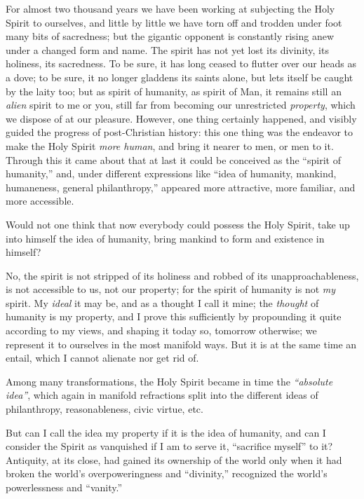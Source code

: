 For almost two thousand years we have been working at subjecting the Holy 
Spirit to ourselves, and little by little we have torn off and trodden under 
foot many bits of sacredness; but the gigantic opponent is constantly rising 
anew under a changed form and name. The spirit has not yet lost its divinity, 
its holiness, its sacredness. To be sure, it has long ceased to flutter over 
our heads as a dove; to be sure, it no longer gladdens its saints alone, but 
lets itself be caught by the laity too; but as spirit of humanity, as spirit 
of Man, it remains still an \textit{alien} spirit to me or you, still far from 
becoming our unrestricted \textit{property}, which we dispose of at our 
pleasure. However, one thing certainly happened, and visibly guided the 
progress of post-Christian history: this one thing was the endeavor to make 
the Holy Spirit \textit{more human}, and bring it nearer to men, or men to it. 
Through this it came about that at last it could be conceived as the ``spirit 
of humanity,'' and, under different expressions like ``idea of humanity, 
mankind, humaneness, general philanthropy,'' appeared more attractive, more 
familiar, and more accessible.

Would not one think that now everybody could possess the Holy Spirit, take up 
into himself the idea of humanity, bring mankind to form and existence in 
himself?

No, the spirit is not stripped of its holiness and robbed of its 
unapproachableness, is not accessible to us, not our property; for the spirit 
of humanity is not \textit{my} spirit. My \textit{ideal} it may be, and as a 
thought I call it mine; the \textit{thought} of humanity is my property, and I 
prove this sufficiently by propounding it quite according to my views, and 
shaping it today so, tomorrow otherwise; we represent it to ourselves in the 
most manifold ways. But it is at the same time an entail, which I cannot 
alienate nor get rid of.

Among many transformations, the Holy Spirit became in time the 
\textit{``absolute idea''}, which again in manifold refractions split into 
the different ideas of philanthropy, reasonableness, civic virtue, etc.

But can I call the idea my property if it is the idea of humanity, and can I 
consider the Spirit as vanquished if I am to serve it, ``sacrifice myself'' 
to it? Antiquity, at its close, had gained its ownership of the world only 
when it had broken the world's overpoweringness and ``divinity,'' recognized 
the world's powerlessness and ``vanity.''

